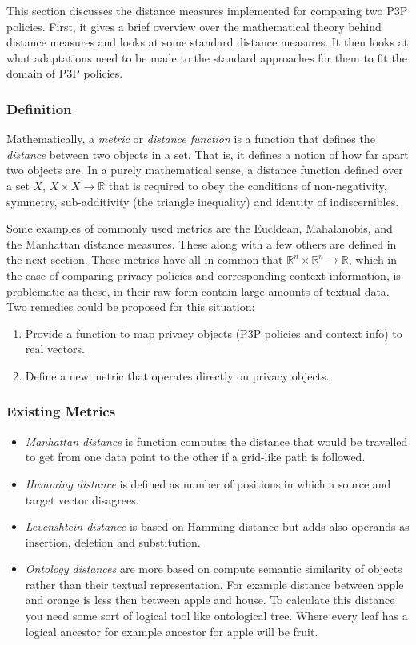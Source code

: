 This section discusses the distance measures implemented for comparing two P3P policies. First, it gives a brief overview over the mathematical theory behind distance measures and looks at some standard distance measures. It then looks at what adaptations need to be made to the standard approaches for them to fit the domain of P3P policies.

\subsubsection{Definition}

Mathematically, a \emph{metric} or \emph{distance function} is a function that defines the \emph{distance} between two objects in a set. That is, it defines a notion of how far apart two objects are. In a purely mathematical sense, a distance function defined over a set $X$, $X\times X\longrightarrow \mathbb{R}$ that is required to obey the conditions of non-negativity, symmetry, sub-additivity (the triangle inequality) and identity of indiscernibles. 

Some examples of commonly used metrics are the Eucldean, Mahalanobis, and the Manhattan distance measures. These along with a few others are defined in the next section. These metrics have all in common that $\mathbb{R}^n\times \mathbb{R}^n\longrightarrow \mathbb{R}$, which in the case of comparing privacy policies and corresponding context information, is problematic as these, in their raw form contain large amounts of textual data. Two remedies could be proposed for this situation:

\begin{enumerate}
\item Provide a function to map privacy objects (P3P policies and context info) to real vectors.
\item Define a new metric that operates directly on privacy objects.
\end{enumerate}



\subsubsection{Existing Metrics}

\begin{itemize}
\item \emph{Manhattan distance} is function computes the distance that would be travelled to get from one data point to the other if a grid-like path is followed. 
\item \emph{Hamming distance} is defined as number of positions in which a source and target vector disagrees.
\item \emph{Levenshtein distance} is based on Hamming distance but adds also operands as insertion, deletion and substitution. 
\item \emph{Ontology distances} are more based on compute semantic similarity of objects rather than their textual representation. For example distance between apple and orange is less then between apple and house. To calculate this distance you need some sort of logical tool like ontological tree. Where every leaf has a logical ancestor for example ancestor for apple will be fruit.
\end{itemize}
